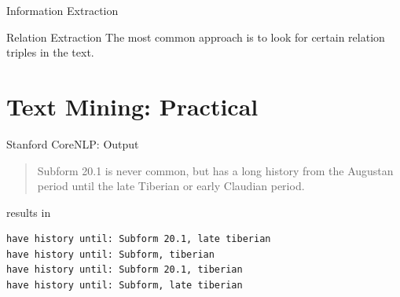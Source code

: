 \documentclass[xcolor=x11names, aspectratio=169]{beamer}
\begin{document}
\begin{frame}{Information Extraction}


\end{frame}

\begin{frame}{Relation Extraction}
The most common approach is to look for certain \alert{relation triples} in the text.
\end{frame}

\section{Text Mining: Practical}

\begin{frame}[fragile]{Stanford CoreNLP: Output}
\begin{quote}
Subform 20.1 is never common, but has a long history from the Augustan period until the late Tiberian or early Claudian period.
\end{quote}
results in
\begin{verbatim}
have history until: Subform 20.1, late tiberian
have history until: Subform, tiberian
have history until: Subform 20.1, tiberian
have history until: Subform, late tiberian
\end{verbatim}
\end{frame}

\maketitle
\end{document}
